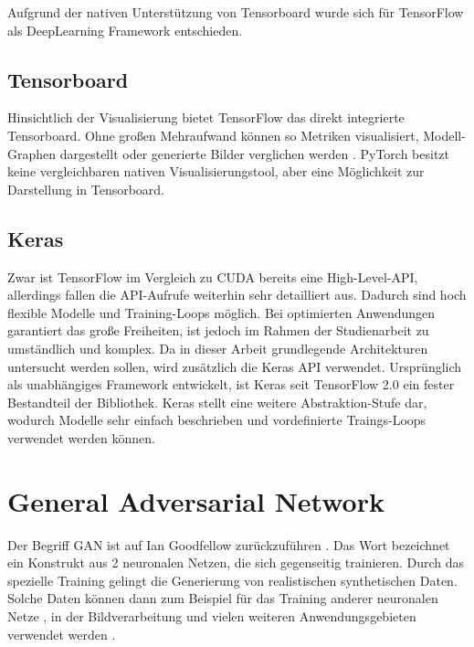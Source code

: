 Aufgrund der nativen Unterstützung von Tensorboard wurde sich für TensorFlow als DeepLearning Framework entschieden.

\subsection{Tensorboard}
Hinsichtlich der Visualisierung bietet TensorFlow das direkt integrierte Tensorboard.
Ohne großen Mehraufwand können so Metriken visualisiert, Modell-Graphen dargestellt oder generierte Bilder verglichen werden \cite{tensorboard}.
PyTorch besitzt keine vergleichbaren nativen Visualisierungstool, aber eine Möglichkeit zur Darstellung in Tensorboard.

\subsection{Keras}
Zwar ist TensorFlow im Vergleich zu CUDA bereits eine High-Level-API, allerdings fallen die API-Aufrufe weiterhin sehr detailliert aus.
Dadurch sind hoch flexible Modelle und Training-Loops möglich.
Bei optimierten Anwendungen garantiert das große Freiheiten, ist jedoch im Rahmen der Studienarbeit zu umständlich und komplex.
Da in dieser Arbeit grundlegende Architekturen untersucht werden sollen, wird zusätzlich die Keras API \cite{keras} verwendet.
Ursprünglich als unabhängiges Framework entwickelt, ist Keras seit TensorFlow 2.0 ein fester Bestandteil der Bibliothek.
Keras stellt eine weitere Abstraktion-Stufe dar, wodurch Modelle sehr einfach beschrieben und vordefinierte Traings-Loops verwendet werden können.



\section{General Adversarial Network}
Der Begriff \acrfull{GAN} ist auf Ian Goodfellow zurückzuführen \cite{gan-original-paper}.
Das Wort bezeichnet ein Konstrukt aus 2 neuronalen Netzen, die sich gegenseitig trainieren.
Durch das spezielle Training gelingt die Generierung von realistischen synthetischen Daten.
Solche Daten können dann zum Beispiel für das Training anderer neuronalen Netze \cite{gan-application-augmenting-training-data}, in der Bildverarbeitung \cite{gan-application-upscaling, gan-application-blending} und vielen weiteren Anwendungsgebieten verwendet werden \cite{gan-application-dna-optimizes-protein-functions, gan-application-audio-synthesis}.

